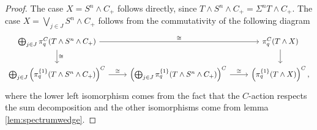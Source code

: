 \begin{proof}
The case $X= S^n\wedge C_+$ follows directly, since $T\wedge S^n\wedge C_+ = 
\Sigma^n T\wedge C_+$. The case $X = \bigvee_{j\in J} S^n\wedge C_+$ follows
from the commutativity of the following diagram
\[
\begin{tikzcd}
\bigoplus_{j\in J} \pi_q^C(T\wedge S^n\wedge C_+)
\arrow{rr}{\cong}\arrow{d}{\cong}
&&\pi_q^C(T\wedge X)
\arrow{d}\\
\bigoplus_{j\in J} \left(\pi_q^{\{1\}}(T\wedge S^n\wedge C_+)\right)^C
\arrow{r}{\cong}
&\left(\bigoplus_{j\in J} \pi_q^{\{1\}}(T\wedge S^n\wedge C_+)\right)^C
\arrow{r}{\cong}
&\left(\pi_q^{\{1\}}(T\wedge X)\right)^C,
\end{tikzcd}
\]
where the lower left isomorphism comes from the fact that the $C$-action
respects the sum decomposition and the other isomorphisms come from
lemma \ref{lem:spectrumwedge}.
\end{proof}

